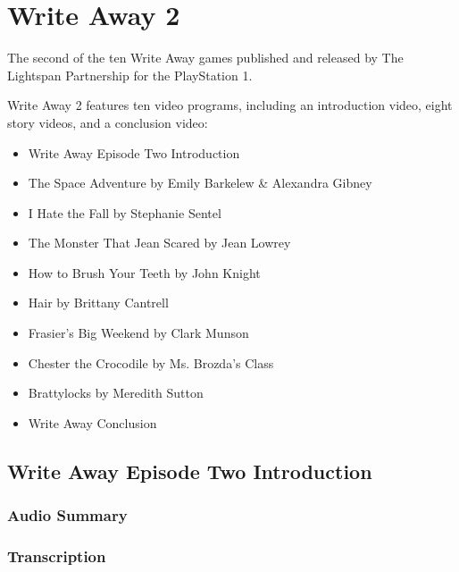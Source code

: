\chapter{Write Away 2}


The second of the ten Write Away games published and released by The Lightspan Partnership for the PlayStation 1.

Write Away 2 features ten video programs, including an introduction video, eight story videos, and a conclusion video:

\begin{itemize}
    \item Write Away Episode Two Introduction
    \item The Space Adventure by Emily Barkelew \& Alexandra Gibney
    \item I Hate the Fall by Stephanie Sentel
    \item The Monster That Jean Scared by Jean Lowrey
    \item How to Brush Your Teeth by John Knight
    \item Hair by Brittany Cantrell
    \item Frasier's Big Weekend by Clark Munson
    \item Chester the Crocodile by Ms. Brozda's Class
    \item Brattylocks by Meredith Sutton
    \item Write Away Conclusion
\end{itemize}

\clearpage
\newpage

\section{Write Away Episode Two Introduction}

\subsection{Audio Summary}

\subsection{Transcription}

